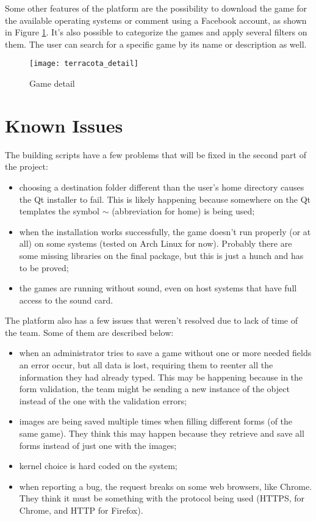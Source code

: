 Some other features of the platform are the possibility to download the game for the available operating systems or comment using a Facebook account, as shown in Figure \ref{fig:game_detail}. It's also possible to categorize the games and apply several filters on them. The user can search for a specific game by its name or description as well.


\begin{figure}[h!]
\centering
\texttt{[image: terracota\_detail]}
\caption{Game detail}
\label {fig:game_detail}
\end{figure}

\section{Known Issues}
\label {sec:issues}

The building scripts have a few problems that will be fixed in the second part of the project:

\begin{itemize}
\item choosing a destination folder different than the user's home directory causes the Qt installer to fail. This is likely happening because somewhere on the Qt templates the symbol $\sim$ (abbreviation for home) is being used;

\item when the installation works successfully, the game doesn't run properly (or at all) on some systems (tested on Arch Linux for now). Probably there are some missing libraries on the final package, but this is just a hunch and has to be proved;

\item the games are running without sound, even on host systems that have full access to the sound card.
\end{itemize}

The platform also has a few issues that weren't resolved due to lack of time of the team. Some of them are described below:

\begin{itemize}
\item when an administrator tries to save a game without one or more needed fields an error occur, but all data is lost, requiring them to reenter all the information they had already typed. This may be happening because in the form validation, the team might be sending a new instance of the object instead of the one with the validation errors;

\item images are being saved multiple times when filling different forms (of the same game). They think this may happen because they retrieve and save all forms instead of just one with the images;

\item kernel choice is hard coded on the system;

\item when reporting a bug, the request breaks on some web browsers, like Chrome. They think it must be something with the protocol being used (HTTPS, for Chrome, and HTTP for Firefox).
\end{itemize}
